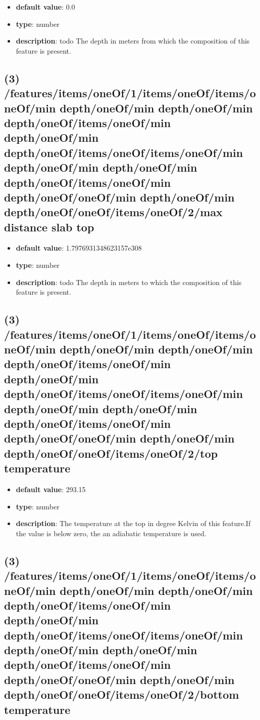 \begin{itemize}[leftmargin=3em]\item {\bf default value}: 0.0
\item {\bf type}: number
\item {\bf description}: todo The depth in meters from which the composition of this feature is present.
\end{itemize}\subsection{(3) /features/items/oneOf/1/items/oneOf/items/oneOf/min depth/oneOf/min depth/oneOf/min depth/oneOf/items/oneOf/min depth/oneOf/min depth/oneOf/items/oneOf/items/oneOf/min depth/oneOf/min depth/oneOf/min depth/oneOf/items/oneOf/min depth/oneOf/oneOf/min depth/oneOf/min depth/oneOf/oneOf/items/oneOf/2/max distance slab top}
\begin{itemize}[leftmargin=3em]\item {\bf default value}: 1.7976931348623157e308
\item {\bf type}: number
\item {\bf description}: todo The depth in meters to which the composition of this feature is present.
\end{itemize}\subsection{(3) /features/items/oneOf/1/items/oneOf/items/oneOf/min depth/oneOf/min depth/oneOf/min depth/oneOf/items/oneOf/min depth/oneOf/min depth/oneOf/items/oneOf/items/oneOf/min depth/oneOf/min depth/oneOf/min depth/oneOf/items/oneOf/min depth/oneOf/oneOf/min depth/oneOf/min depth/oneOf/oneOf/items/oneOf/2/top temperature}
\begin{itemize}[leftmargin=3em]\item {\bf default value}: 293.15
\item {\bf type}: number
\item {\bf description}: The temperature at the top in degree Kelvin of this feature.If the value is below zero, the an adiabatic temperature is used.
\end{itemize}\subsection{(3) /features/items/oneOf/1/items/oneOf/items/oneOf/min depth/oneOf/min depth/oneOf/min depth/oneOf/items/oneOf/min depth/oneOf/min depth/oneOf/items/oneOf/items/oneOf/min depth/oneOf/min depth/oneOf/min depth/oneOf/items/oneOf/min depth/oneOf/oneOf/min depth/oneOf/min depth/oneOf/oneOf/items/oneOf/2/bottom temperature}

